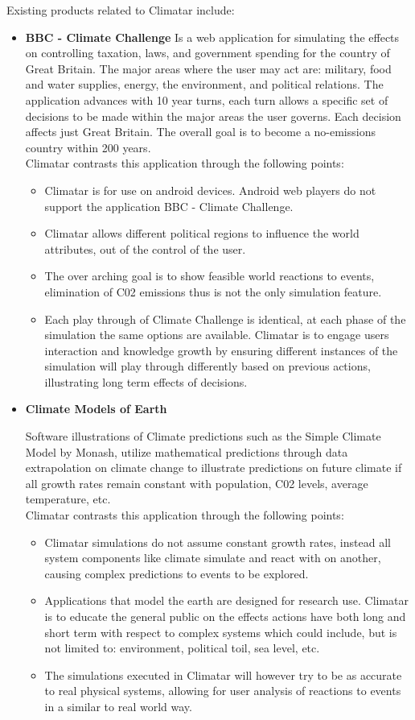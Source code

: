 \documentclass[]{article}
\begin{document}
Existing products related to Climatar include: 
\begin{itemize}
	\item \textbf{BBC - Climate Challenge} 	
		\cite{BBC}Is a web application for simulating the effects on controlling taxation, laws, and government spending for the country of Great Britain. The major areas where the user may act are: military, food and water supplies, energy, the environment, and political relations. The application advances with 10 year turns, each turn allows a specific set of decisions to be made within the major areas the user governs. Each decision affects just Great Britain. The overall goal is to become a no-emissions country within 200 years. \\
		Climatar contrasts this application through the following points:
		\begin{itemize}
			\item Climatar is for use on android devices. Android web players do not support the application BBC - Climate Challenge.
			\item Climatar allows different political regions to influence the world attributes, out of the control of the user.
			\item The over arching goal is to show feasible world reactions to events, elimination of C02 emissions thus is not the only simulation feature.
			\item Each play through of Climate Challenge is identical, at each phase of the simulation the same options are available. Climatar is to engage users interaction and knowledge growth by ensuring different instances of the simulation will play through differently based on previous actions, illustrating long term effects of decisions.
		\end{itemize}
	
	\item \textbf{Climate Models of Earth}

		Software illustrations of Climate predictions such as the Simple Climate Model by Monash, utilize mathematical predictions through data extrapolation on climate change to illustrate predictions on future climate if all growth rates remain constant with population, C02 levels, average temperature, etc\cite{ClimM}.\\
	Climatar contrasts this application through the following points:
		\begin{itemize}
			\item Climatar simulations do not assume constant growth rates, instead all system components like climate simulate and react with on another, causing complex predictions to events to be explored.
			\item Applications that model the earth are designed for  research use. Climatar is to educate the general public on the effects actions have both long and short term with respect to complex systems which could include, but is not limited to: environment, political toil, sea level, etc.
			\item The simulations executed in Climatar will however try to be as accurate to real physical systems, allowing for user analysis of reactions to events in a similar to real world way.
		\end{itemize}	 


\end{itemize}
\end{document}
